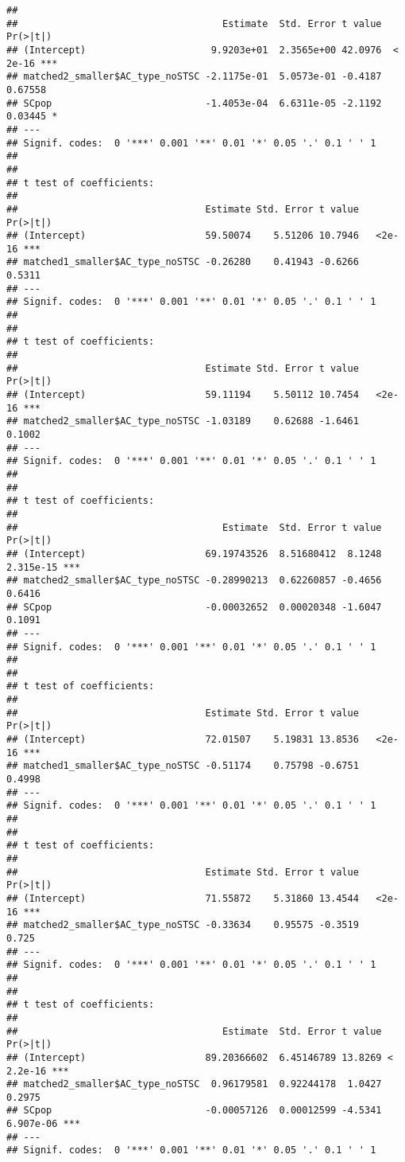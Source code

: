 \documentclass[
]{article}
\begin{document}
\begin{verbatim}
## 
##                                    Estimate  Std. Error t value Pr(>|t|)    
## (Intercept)                      9.9203e+01  2.3565e+00 42.0976  < 2e-16 ***
## matched2_smaller$AC_type_noSTSC -2.1175e-01  5.0573e-01 -0.4187  0.67558    
## SCpop                           -1.4053e-04  6.6311e-05 -2.1192  0.03445 *  
## ---
## Signif. codes:  0 '***' 0.001 '**' 0.01 '*' 0.05 '.' 0.1 ' ' 1
## 
## 
## t test of coefficients:
## 
##                                 Estimate Std. Error t value Pr(>|t|)    
## (Intercept)                     59.50074    5.51206 10.7946   <2e-16 ***
## matched1_smaller$AC_type_noSTSC -0.26280    0.41943 -0.6266   0.5311    
## ---
## Signif. codes:  0 '***' 0.001 '**' 0.01 '*' 0.05 '.' 0.1 ' ' 1
## 
## 
## t test of coefficients:
## 
##                                 Estimate Std. Error t value Pr(>|t|)    
## (Intercept)                     59.11194    5.50112 10.7454   <2e-16 ***
## matched2_smaller$AC_type_noSTSC -1.03189    0.62688 -1.6461   0.1002    
## ---
## Signif. codes:  0 '***' 0.001 '**' 0.01 '*' 0.05 '.' 0.1 ' ' 1
## 
## 
## t test of coefficients:
## 
##                                    Estimate  Std. Error t value  Pr(>|t|)    
## (Intercept)                     69.19743526  8.51680412  8.1248 2.315e-15 ***
## matched2_smaller$AC_type_noSTSC -0.28990213  0.62260857 -0.4656    0.6416    
## SCpop                           -0.00032652  0.00020348 -1.6047    0.1091    
## ---
## Signif. codes:  0 '***' 0.001 '**' 0.01 '*' 0.05 '.' 0.1 ' ' 1
## 
## 
## t test of coefficients:
## 
##                                 Estimate Std. Error t value Pr(>|t|)    
## (Intercept)                     72.01507    5.19831 13.8536   <2e-16 ***
## matched1_smaller$AC_type_noSTSC -0.51174    0.75798 -0.6751   0.4998    
## ---
## Signif. codes:  0 '***' 0.001 '**' 0.01 '*' 0.05 '.' 0.1 ' ' 1
## 
## 
## t test of coefficients:
## 
##                                 Estimate Std. Error t value Pr(>|t|)    
## (Intercept)                     71.55872    5.31860 13.4544   <2e-16 ***
## matched2_smaller$AC_type_noSTSC -0.33634    0.95575 -0.3519    0.725    
## ---
## Signif. codes:  0 '***' 0.001 '**' 0.01 '*' 0.05 '.' 0.1 ' ' 1
## 
## 
## t test of coefficients:
## 
##                                    Estimate  Std. Error t value  Pr(>|t|)    
## (Intercept)                     89.20366602  6.45146789 13.8269 < 2.2e-16 ***
## matched2_smaller$AC_type_noSTSC  0.96179581  0.92244178  1.0427    0.2975    
## SCpop                           -0.00057126  0.00012599 -4.5341 6.907e-06 ***
## ---
## Signif. codes:  0 '***' 0.001 '**' 0.01 '*' 0.05 '.' 0.1 ' ' 1

\end{verbatim}
\end{document}
